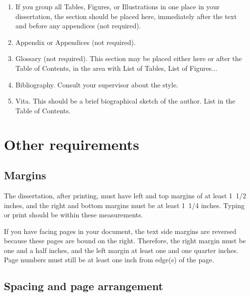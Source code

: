 \documentclass[12pt]{report} %
\theoremstyle{definition}
\theoremstyle{remark}
\begin{document}
\begin{enumerate}
\item If you group all Tables, 
%
Figures, 
%
or Illustrations 
%
in 
one place in your dissertation, the section should be placed 
here, immediately after the text and before any appendices 
(not required).

\item Appendix or Appendices 
%
%
(not required).

\item Glossary 
%
(not required). This section may be placed 
either here or after the Table of Contents, in the area with 
List of Tables, List of Figures...

\item Bibliography. 
%
Consult your supervisor about the style.

\item Vita. 
%
This should be a brief biographical sketch of the 
author. List in the Table of Contents.


\end{enumerate}


\section{Other requirements}
%


\subsection{Margins}
%

The dissertation, after printing, must have left and top 
margins of at least 1~1/2 inches, and the right and bottom 
margins must be at least 1~1/4 inches. Typing or print should 
be within these measurements. 

If you have facing pages in your document, the text side 
margins are reversed because these pages are bound on the 
right. Therefore, the right margin must be one and a half 
inches, and the left margin at least one and one quarter 
inches. Page numbers must still be at least one inch from 
edge(s) of the page.

\subsection{Spacing and page arrangement}
%
%
\end{document}
